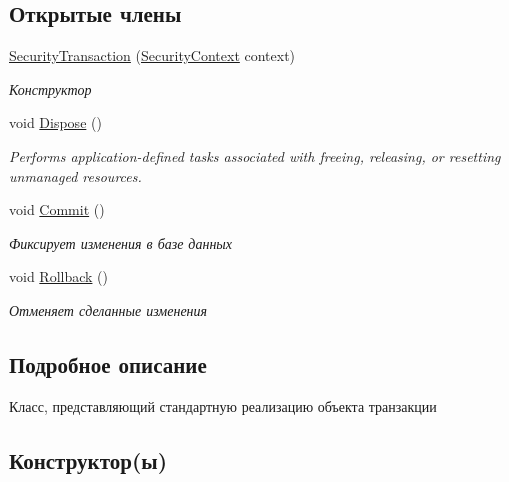 \subsection*{Открытые члены}
\begin{DoxyCompactItemize}
\item 
\hyperlink{class_security_1_1_entity_framework_1_1_security_transaction_a71b3f26ff92fcb648744f39638153e28}{Security\+Transaction} (\hyperlink{class_security_1_1_entity_dal_1_1_security_context}{Security\+Context} context)
\begin{DoxyCompactList}\small\item\em Конструктор \end{DoxyCompactList}\item 
void \hyperlink{class_security_1_1_entity_framework_1_1_security_transaction_ae89d12f6a50b38dc368e98dac4c9ee7f}{Dispose} ()
\begin{DoxyCompactList}\small\item\em Performs application-\/defined tasks associated with freeing, releasing, or resetting unmanaged resources. \end{DoxyCompactList}\item 
void \hyperlink{class_security_1_1_entity_framework_1_1_security_transaction_a0878ace286c2f7459eecbc24331d0288}{Commit} ()
\begin{DoxyCompactList}\small\item\em Фиксирует изменения в базе данных \end{DoxyCompactList}\item 
void \hyperlink{class_security_1_1_entity_framework_1_1_security_transaction_a926ab5cfb24bab1a1e5ef2e057f12230}{Rollback} ()
\begin{DoxyCompactList}\small\item\em Отменяет сделанные изменения \end{DoxyCompactList}\end{DoxyCompactItemize}


\subsection{Подробное описание}
Класс, представляющий стандартную реализацию объекта транзакции 



\subsection{Конструктор(ы)}
\mbox{\label{class_security_1_1_entity_framework_1_1_security_transaction_a71b3f26ff92fcb648744f39638153e28}} 
